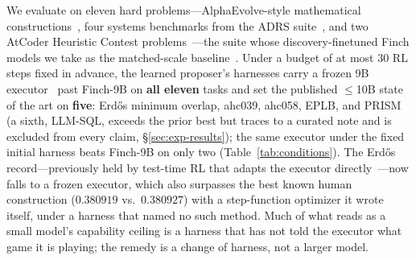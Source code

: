 We evaluate on eleven hard problems---AlphaEvolve-style mathematical
constructions~\citep{alphaevolve,alphaevolvemath}, four systems benchmarks
from the ADRS suite~\citep{barbarians}, and two AtCoder Heuristic Contest
problems~\citep{ahc,alebench}---the suite whose discovery-finetuned Finch
models we take as the matched-scale baseline~\citep{finch}.  Under a budget
of at most 30 RL steps fixed in advance, the learned proposer's harnesses
carry a frozen 9B executor~\citep{qwen3} past Finch-9B on \textbf{all
eleven} tasks and set the published $\le$10B state of the art on
\textbf{five}: Erd\H{o}s minimum overlap, ahc039, ahc058, EPLB, and PRISM
(a sixth, LLM-SQL, exceeds the prior best but traces to a curated note and
is excluded from every claim, \S\ref{sec:exp-results}); the same executor
under the fixed initial harness beats Finch-9B on only two
(Table~\ref{tab:conditions}).  The Erd\H{o}s record---previously held by
test-time RL that adapts the executor
directly~\citep{tttdiscover,thetaevolve}---now falls to a frozen executor,
which also surpasses the best known human construction ($0.380919$ vs.\
$0.380927$) with a step-function optimizer it wrote itself, under a harness
that named no such method.  Much of what reads as a small model's
capability ceiling is a harness that has not told the executor what game it
is playing; the remedy is a change of harness, not a larger model.
